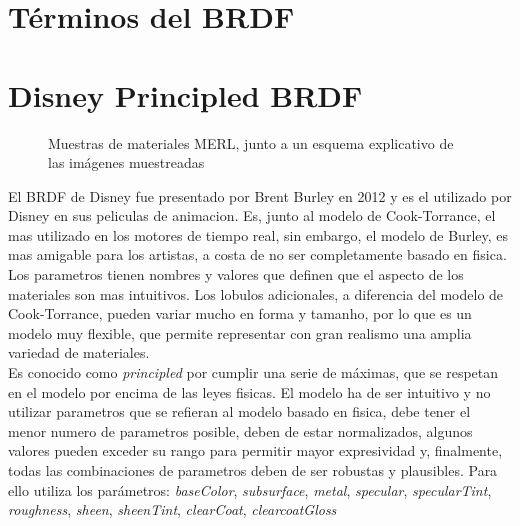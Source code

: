 \section{T\'erminos del BRDF}

\section{Disney Principled BRDF}

\begin{figure}[H]
    \vspace{0.5cm}
    \centering
    \caption{Muestras de materiales MERL, junto a un esquema explicativo de las im\'agenes muestreadas}
    \vspace{0.5cm}
\end{figure}

El BRDF de Disney fue presentado por Brent Burley en 2012 y es el utilizado por Disney en sus peliculas de animacion. Es,
junto al modelo de Cook-Torrance, el mas utilizado en los motores de tiempo real, sin embargo, el modelo de Burley, es mas
amigable para los artistas, a costa de no ser completamente basado en fisica. Los parametros tienen nombres y valores que
definen que el aspecto de los materiales son mas intuitivos. Los lobulos adicionales, a diferencia del modelo de Cook-Torrance,
pueden variar mucho en forma y tamanho, por lo que es un modelo muy flexible, que permite representar con gran realismo una
amplia variedad de materiales.\\

Es conocido como \textit{principled} por cumplir una serie de m\'aximas, que se respetan en el modelo por encima de las leyes fisicas.
El modelo ha de ser intuitivo y no utilizar parametros que se refieran al modelo basado en fisica, debe tener el menor
numero de parametros posible, deben de estar normalizados, algunos valores pueden exceder su rango para permitir mayor
expresividad y, finalmente, todas las combinaciones de parametros deben de ser robustas y plausibles. Para ello utiliza los
par\'ametros: \textit{baseColor}, \textit{subsurface}, \textit{metal}, \textit{specular}, \textit{specularTint}, \textit{roughness},
\textit{sheen}, \textit{sheenTint}, \textit{clearCoat}, \textit{clearcoatGloss}

